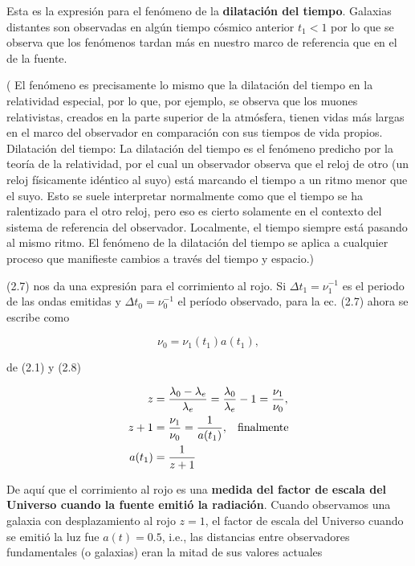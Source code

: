 \documentclass[11pt]{article}
\begin{document}
Esta es la expresión para el fenómeno de la {\bf{dilatación del tiempo}}. Galaxias distantes son observadas en algún tiempo cósmico anterior $t_1 < 1$ por lo que se observa que los fenómenos tardan más en nuestro marco de referencia que en el de la fuente. 

( El fenómeno es precisamente lo mismo que la dilatación del tiempo en la relatividad especial, por lo que, por ejemplo, se observa que los muones relativistas, creados en la parte superior de la atmósfera, tienen vidas más largas en el marco del observador en comparación con sus tiempos de vida propios. 
Dilatación del tiempo: La dilatación del tiempo es el fenómeno predicho por la teoría de la relatividad, por el cual un observador observa que el reloj de otro (un reloj físicamente idéntico al suyo) está marcando el tiempo a un ritmo menor que el suyo. Esto se suele interpretar normalmente como que el tiempo se ha ralentizado para el otro reloj, pero eso es cierto solamente en el contexto del sistema de referencia del observador. Localmente, el tiempo siempre está pasando al mismo ritmo. El fenómeno de la dilatación del tiempo se aplica a cualquier proceso que manifieste cambios a través del tiempo y espacio.)


(2.7) nos da una expresión para el corrimiento al rojo. Si $\Delta t_1 = \nu_1^{-1}$ es el periodo de las ondas emitidas y  $\Delta t_0 = \nu_0^{-1}$ el período observado, para la ec. (2.7) ahora se escribe como

\begin{equation}
    \nu_0 = \nu_1(t_1) a(t_1),
\end{equation}

de (2.1) y (2.8) 

\begin{align}
     z & = \frac{\lambda_0 - \lambda_e}{\lambda_e} = \frac{\lambda_0 }{\lambda_e} - 1 = \frac{\nu_1}{\nu_0}, \\
     z + 1 & = \frac{\nu_1}{\nu_0} = \frac{1}{a(t_1)}, \hspace{0.3cm} \text{finalmente} \\
     a(t_1) & = \frac{1}{z+1}
\end{align}


De aquí que el corrimiento al rojo es una {\bf{medida del factor de escala del Universo cuando la fuente emitió la radiación}}. 
Cuando observamos una galaxia con desplazamiento al rojo $z = 1$, el factor de escala del Universo cuando se emitió la luz fue $a (t) = 0.5$, i.e., las distancias entre observadores fundamentales (o galaxias) eran la mitad de sus valores actuales
\end{document}

